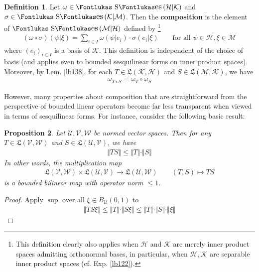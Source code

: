 \documentclass[12pt,b5paper,notitlepage]{article}
\theoremstyle{definition}
\newtheorem{df}{Definition}[subsection]
\theoremstyle{plain}
\newtheorem{pp}[df]{Proposition}
\DeclareMathOperator{\Ses}{\text{\Fontlukas S}\text{\kern -0pt {\Fontlukas\large es}}\,}
\newcommand{\fk}{\mathfrak}
\newcommand{\ovl}{\overline}
\newcommand{\MU}{\mathcal U}
\newcommand{\MV}{\mathcal V}
\newcommand{\MW}{\mathcal W}
\newcommand{\MH}{\mathcal H}
\newcommand{\MK}{\mathcal K}
\newcommand{\MM}{\mathcal M}
\numberwithin{equation}{section}
\begin{document}
\begin{df}\label{lb144}
Let $\omega\in\Ses(\MH|\MK)$ and $\sigma\in\Ses(\MK|\MM)$. Then the \textbf{composition} \pmb{$\omega\circ\sigma$}  is the element of $\Ses(\MM|\MH)$ defined by \footnote{This definition clearly also applies when $\MH$ and $\MK$ are merely inner product spaces admitting orthonormal bases, in particular, when $\MH,\MK$ are separable inner product spaces (cf. Exp. \ref{lb122}).}
\begin{align*}
(\omega\circ\sigma)(\psi|\xi)=\sum_{i\in I}\omega(\psi|e_i)\cdot\sigma(e_i|\xi)\qquad\text{for all }\psi\in\MH,\xi\in\MM
\end{align*}
where $(e_i)_{i\in I}$ is a basis of $\MK$. This definition is independent of the choice of basis (and applies even to bounded sesquilinear forms on inner product spaces). Moreover, by Lem. \ref{lb138}, for each $T\in\fk L(\MK,\MH)$ and $S\in\fk L(\MM,\MK)$, we have
\begin{align*}
\omega_{T\circ S}=\omega_T\circ\omega_S
\end{align*}
\end{df}





However, many properties about composition that are straightforward from the perspective of bounded linear operators become far less transparent when viewed in terms of sesquilinear forms. For instance, consider the following basic result:

\begin{pp}\label{lb143}
Let $\MU,\MV,\MW$ be normed vector spaces. Then for any  $T\in\fk L(\MV,\MW)$ and $S\in\fk L(\MU,\MV)$, we have
\begin{align*}
\Vert TS\Vert\leq \Vert T\Vert\cdot\Vert S\Vert
\end{align*}
In other words, the multiplication map
\begin{align*}
\fk L(\MV,\MW)\times\fk L(\MU,\MV)\rightarrow\fk L(\MU,\MW)\qquad (T,S)\mapsto TS
\end{align*}
is a bounded bilinear map with operator norm $\leq 1$.
\end{pp}


\begin{proof}
Apply $\sup$ over all $\xi\in\ovl B_\MU(0,1)$ to
\begin{align*}
\Vert TS\xi\Vert\leq\Vert T\Vert\cdot \Vert S\xi\Vert\leq \Vert T\Vert\cdot\Vert S\Vert\cdot\Vert\xi\Vert
\end{align*}
\end{proof}
\end{document}
